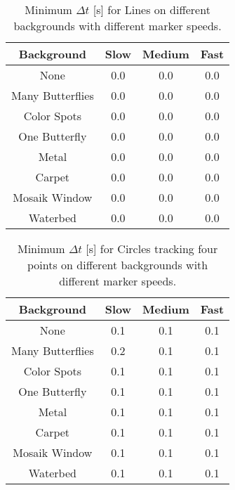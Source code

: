 \begin{table}[H]
\center
\begin{tabular}{|c|c|c|c|}
\hline
Background        & Slow & Medium & Fast \\ \hline
None              & 0.0  & 0.0    & 0.0  \\ \hline
Many Butterflies  & 0.0  & 0.0    & 0.0  \\ \hline
Color Spots       & 0.0  & 0.0    & 0.0  \\ \hline
One Butterfly     & 0.0  & 0.0    & 0.0  \\ \hline
Metal             & 0.0  & 0.0    & 0.0  \\ \hline
Carpet            & 0.0  & 0.0    & 0.0  \\ \hline
Mosaik Window     & 0.0  & 0.0    & 0.0  \\ \hline
Waterbed          & 0.0  & 0.0    & 0.0  \\ \hline
\end{tabular}
\caption{Minimum $\Delta t$ [s] for Lines on different backgrounds with different marker speeds.}
 \label{tb:min_dt_lines}
\end{table}

\begin{table}[H]
\center
\begin{tabular}{|c|c|c|c|}
\hline
Background       & Slow & Medium & Fast \\ \hline
None             & 0.1  & 0.1    & 0.1  \\ \hline
Many Butterflies & 0.2  & 0.1    & 0.1  \\ \hline
Color Spots      & 0.1  & 0.1    & 0.1  \\ \hline
One Butterfly    & 0.1  & 0.1    & 0.1  \\ \hline
Metal            & 0.1  & 0.1    & 0.1  \\ \hline
Carpet           & 0.1  & 0.1    & 0.1  \\ \hline
Mosaik Window    & 0.1  & 0.1    & 0.1  \\ \hline
Waterbed         & 0.1  & 0.1    & 0.1  \\ \hline
\end{tabular}
\caption{Minimum $\Delta t$ [s] for Circles tracking four points on different backgrounds with different marker speeds.}
\label{tb:min_dt_circles}
\end{table}

